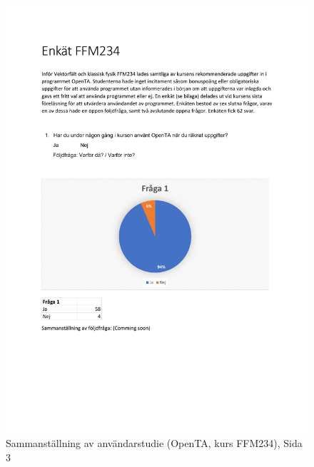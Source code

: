 \begin{figure}[hbtp]
    \centering
    \includegraphics[page=3,scale=0.85]{appendix/form_survey.pdf}
    \caption*{Sammanställning av användarstudie (OpenTA, kurs FFM234), Sida 3}
    \label{fig:openform3}
\end{figure}

